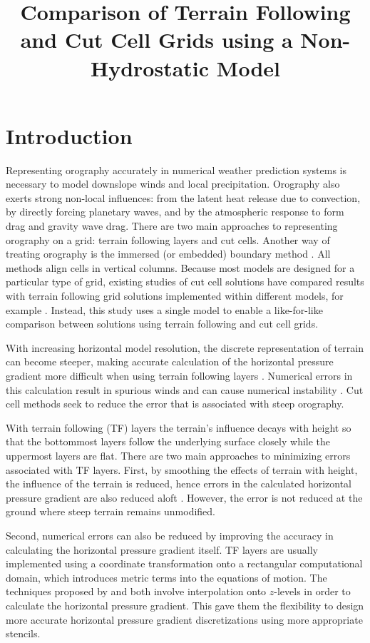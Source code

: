 \documentclass[draft]{ametsoc}
\title{Comparison of Terrain Following and Cut Cell Grids using a Non-Hydrostatic Model}
\affiliation{Department of Meteorology, University of Reading, Reading, United Kingdom}
\begin{document}
\maketitle

\section{Introduction}
Representing orography accurately in numerical weather prediction systems is necessary to model downslope winds and local precipitation.  Orography also exerts strong non-local influences: from the latent heat release due to convection, by directly forcing planetary waves, and by the atmospheric response to form drag and gravity wave drag.  There are two main approaches to representing orography on a grid: terrain following layers and cut cells.  Another way of treating orography is the immersed (or embedded) boundary method \citep{simon2012}.  All methods align cells in vertical columns.  Because most models are designed for a particular type of grid, existing studies of cut cell solutions have compared results with terrain following grid solutions implemented within different models, for example \citet{good2014}.  Instead, this study uses a single model to enable a like-for-like comparison between solutions using terrain following and cut cell grids.

With increasing horizontal model resolution, the discrete representation of terrain can become steeper, making accurate calculation of the horizontal pressure gradient more difficult when using terrain following layers \citep{gary1973,steppeler2002}.  Numerical errors in this calculation result in spurious winds and can cause numerical instability \citep{fast2003,webster2003}.  Cut cell methods seek to reduce the error that is associated with steep orography.

With terrain following (TF) layers the terrain's influence decays with height so that the bottommost layers follow the underlying surface closely while the uppermost layers are flat.  There are two main approaches to minimizing errors associated with TF layers.  First, by smoothing the effects of terrain with height, the influence of the terrain is reduced, hence errors in the calculated horizontal pressure gradient are also reduced aloft \citep{schaer2002,leuenberger2010,klemp2011}.  However, the error is not reduced at the ground where steep terrain remains unmodified.

Second, numerical errors can also be reduced by improving the accuracy in calculating the horizontal pressure gradient itself.  TF layers are usually implemented using a coordinate transformation onto a rectangular computational domain, which introduces metric terms into the equations of motion.  The techniques proposed by \citet{klemp2011} and \cite{zaengl2012} both involve interpolation onto $z$-levels in order to calculate the horizontal pressure gradient.  This gave them the flexibility to design more accurate horizontal pressure gradient discretizations using more appropriate stencils.
\end{document}
